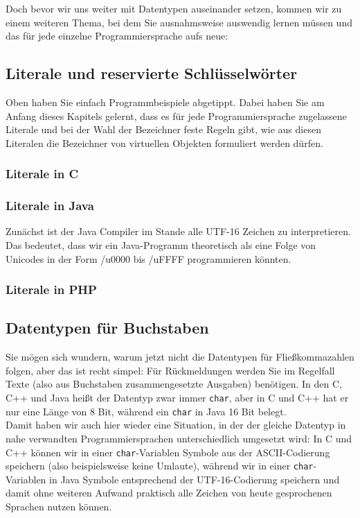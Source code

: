 Doch bevor wir uns weiter mit Datentypen auseinander setzen, kommen wir zu einem weiteren Thema, bei dem Sie ausnahmsweise auswendig lernen müssen und das für jede einzelne Programmiersprache aufs neue:

\subsection{Literale und reservierte Schlüsselwörter}

Oben haben Sie einfach Programmbeispiele abgetippt. Dabei haben Sie am Anfang dieses Kapitels gelernt, dass es für jede Programmiersprache zugelassene Literale und bei der Wahl der Bezeichner feste Regeln gibt, wie aus diesen Literalen die Bezeichner von virtuellen Objekten formuliert werden dürfen.

\subsubsection{Literale in C}

\subsubsection{Literale in Java}

Zunächst ist der Java Compiler im Stande alle UTF-16 Zeichen zu interpretieren. Das bedeutet, dass wir ein Java-Programm theoretisch als eine Folge von Unicodes in der Form /u0000 bis /uFFFF programmieren könnten.\\




\subsubsection{Literale in PHP}


\subsection{Datentypen für Buchstaben}

Sie mögen sich wundern, warum jetzt nicht die Datentypen für Fließkommazahlen folgen, aber das ist recht simpel: Für Rückmeldungen werden Sie im Regelfall Texte (also aus Buchstaben zusammengesetzte Ausgaben) benötigen. In den C, C++ und Java heißt der Datentyp zwar immer \verb|char|, aber in C und C++ hat er nur eine Länge von 8 Bit, während ein \verb|char| in Java 16 Bit belegt.\\

Damit haben wir auch hier wieder eine Situation, in der der gleiche Datentyp in nahe verwandten Programmiersprachen unterschiedlich umgesetzt wird: In C und C++ können wir in einer \verb|char|-Variablen Symbole aus der ASCII-Codierung speichern (also beispielsweise keine Umlaute), während wir in einer \verb|char|-Variablen in Java Symbole entsprechend der UTF-16-Codierung speichern und damit ohne weiteren Aufwand praktisch alle Zeichen von heute gesprochenen Sprachen nutzen können. 

